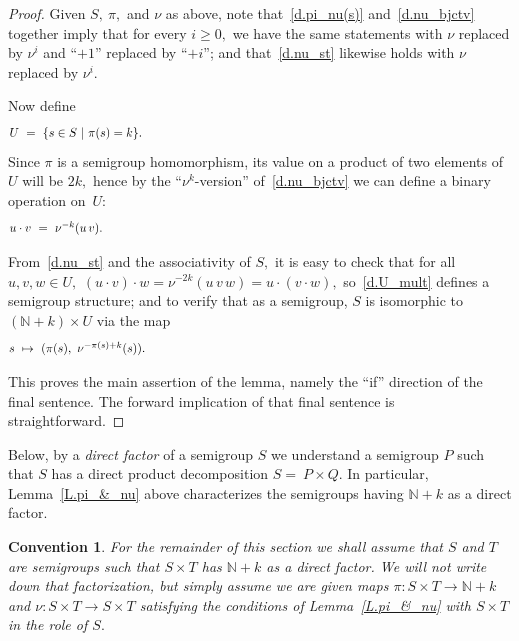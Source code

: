 \documentclass{amsart}
\newtheorem{convention}[theorem]{Convention}
\numberwithin{equation}{section}
\numberwithin{theorem}{section}
\newcommand{\N}{\mathbb{N}}
\begin{document}
\begin{proof}
Given $S,~\pi,$ and $\nu$ as above, note that~\eqref{d.pi_nu(s)}
and~\eqref{d.nu_bjctv} together imply that for every $i\geq 0,$
we have the same statements with $\nu$ replaced by $\nu^i$
and ``$+1$'' replaced by ``$+i$''; and that~\eqref{d.nu_st} likewise
holds with $\nu$ replaced by $\nu^i.$

Now define
%
\begin{equation}\begin{minipage}[c]{35pc}\label{d.S_0=ker}
$U~=~\{s\in S~|~\pi(s)=k\}.$
\end{minipage}\end{equation}
%
Since $\pi$ is a semigroup homomorphism, its
value on a product of two elements of $U$ will be $2k,$ hence by
the ``$\!\nu^k\!$-version'' of~\eqref{d.nu_bjctv}
we can define a binary operation on~$U$:
%
\begin{equation}\begin{minipage}[c]{35pc}\label{d.U_mult}
$u\cdot v~=~\nu^{-k}(u\,v).$
\end{minipage}\end{equation}

From~\eqref{d.nu_st} and
the associativity of $S,$ it is easy to check that for all $u,v,w\in U,$
$(u\cdot v)\cdot w=\nu^{-2k}(u\,v\,w)=u\cdot(v\cdot w),$
so~\eqref{d.U_mult} defines a semigroup structure; and to
verify that as a semigroup, $S$ is isomorphic
to $(\N\!+\!k)\times U$ via the map
%
\begin{equation}\begin{minipage}[c]{35pc}\label{d.nu^-}
$s~\mapsto~(\pi(s),\ \nu^{-\pi(s)+k}(s)).$
\end{minipage}\end{equation}

This proves the main assertion of the lemma, namely
the ``if'' direction of the final sentence.
The forward implication of that final sentence is straightforward.
\end{proof}

Below, by a {\em direct factor}
of a semigroup $S$ we understand a semigroup $P$ such
that $S$ has a direct product decomposition $S =~ P\times Q.$
In particular, Lemma~\ref{L.pi_&_nu} above characterizes the semigroups
having $\N\!+\!k$ as a direct factor.

\begin{convention}\label{Cv.S,T,nu}
For the remainder of this section we shall assume
that $S$ and $T$ are semigroups such that $S\times T$ has
$\N\!+\!k$ as a direct factor.
We will not write down that factorization,
but simply assume we are given maps $\pi: S\times T\to\N\!+\!k$ and
$\nu: S\times T\to S\times T$ satisfying the conditions of
Lemma~\ref{L.pi_&_nu} with $S\times T$ in the role of $S.$
\end{convention}
\end{document}
